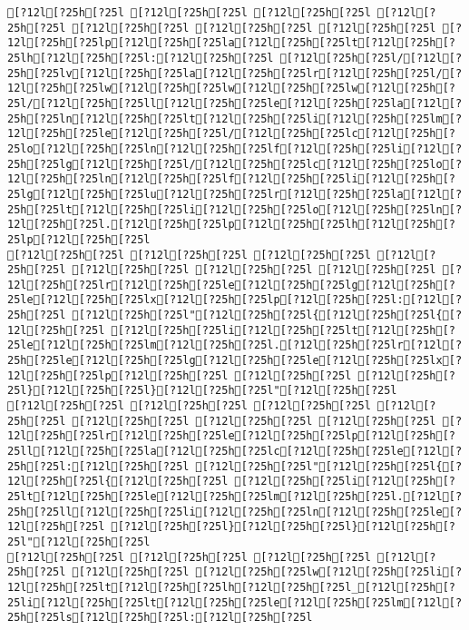 \documentclass{scrartcl}
\begin{document}
\begin{Verbatim}
[?12l[?25h[?25l [?12l[?25h[?25l [?12l[?25h[?25l [?12l[?25h[?25l [?12l[?25h[?25l [?12l[?25h[?25l [?12l[?25h[?25l [?12l[?25h[?25lp[?12l[?25h[?25la[?12l[?25h[?25lt[?12l[?25h[?25lh[?12l[?25h[?25l:[?12l[?25h[?25l [?12l[?25h[?25l/[?12l[?25h[?25lv[?12l[?25h[?25la[?12l[?25h[?25lr[?12l[?25h[?25l/[?12l[?25h[?25lw[?12l[?25h[?25lw[?12l[?25h[?25lw[?12l[?25h[?25l/[?12l[?25h[?25ll[?12l[?25h[?25le[?12l[?25h[?25la[?12l[?25h[?25ln[?12l[?25h[?25lt[?12l[?25h[?25li[?12l[?25h[?25lm[?12l[?25h[?25le[?12l[?25h[?25l/[?12l[?25h[?25lc[?12l[?25h[?25lo[?12l[?25h[?25ln[?12l[?25h[?25lf[?12l[?25h[?25li[?12l[?25h[?25lg[?12l[?25h[?25l/[?12l[?25h[?25lc[?12l[?25h[?25lo[?12l[?25h[?25ln[?12l[?25h[?25lf[?12l[?25h[?25li[?12l[?25h[?25lg[?12l[?25h[?25lu[?12l[?25h[?25lr[?12l[?25h[?25la[?12l[?25h[?25lt[?12l[?25h[?25li[?12l[?25h[?25lo[?12l[?25h[?25ln[?12l[?25h[?25l.[?12l[?25h[?25lp[?12l[?25h[?25lh[?12l[?25h[?25lp[?12l[?25h[?25l
[?12l[?25h[?25l [?12l[?25h[?25l [?12l[?25h[?25l [?12l[?25h[?25l [?12l[?25h[?25l [?12l[?25h[?25l [?12l[?25h[?25l [?12l[?25h[?25lr[?12l[?25h[?25le[?12l[?25h[?25lg[?12l[?25h[?25le[?12l[?25h[?25lx[?12l[?25h[?25lp[?12l[?25h[?25l:[?12l[?25h[?25l [?12l[?25h[?25l"[?12l[?25h[?25l{[?12l[?25h[?25l{[?12l[?25h[?25l [?12l[?25h[?25li[?12l[?25h[?25lt[?12l[?25h[?25le[?12l[?25h[?25lm[?12l[?25h[?25l.[?12l[?25h[?25lr[?12l[?25h[?25le[?12l[?25h[?25lg[?12l[?25h[?25le[?12l[?25h[?25lx[?12l[?25h[?25lp[?12l[?25h[?25l [?12l[?25h[?25l [?12l[?25h[?25l}[?12l[?25h[?25l}[?12l[?25h[?25l"[?12l[?25h[?25l
[?12l[?25h[?25l [?12l[?25h[?25l [?12l[?25h[?25l [?12l[?25h[?25l [?12l[?25h[?25l [?12l[?25h[?25l [?12l[?25h[?25l [?12l[?25h[?25lr[?12l[?25h[?25le[?12l[?25h[?25lp[?12l[?25h[?25ll[?12l[?25h[?25la[?12l[?25h[?25lc[?12l[?25h[?25le[?12l[?25h[?25l:[?12l[?25h[?25l [?12l[?25h[?25l"[?12l[?25h[?25l{[?12l[?25h[?25l{[?12l[?25h[?25l [?12l[?25h[?25li[?12l[?25h[?25lt[?12l[?25h[?25le[?12l[?25h[?25lm[?12l[?25h[?25l.[?12l[?25h[?25ll[?12l[?25h[?25li[?12l[?25h[?25ln[?12l[?25h[?25le[?12l[?25h[?25l [?12l[?25h[?25l}[?12l[?25h[?25l}[?12l[?25h[?25l"[?12l[?25h[?25l
[?12l[?25h[?25l [?12l[?25h[?25l [?12l[?25h[?25l [?12l[?25h[?25l [?12l[?25h[?25l [?12l[?25h[?25lw[?12l[?25h[?25li[?12l[?25h[?25lt[?12l[?25h[?25lh[?12l[?25h[?25l_[?12l[?25h[?25li[?12l[?25h[?25lt[?12l[?25h[?25le[?12l[?25h[?25lm[?12l[?25h[?25ls[?12l[?25h[?25l:[?12l[?25h[?25l

\end{Verbatim}
\end{document}
